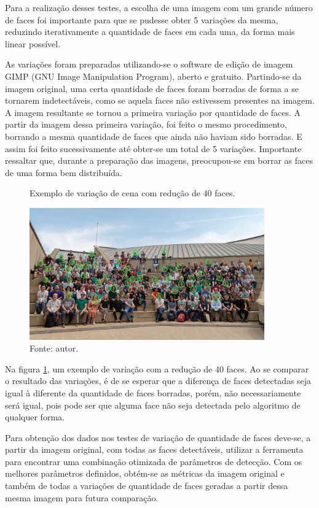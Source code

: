 Para a realização desses testes, a escolha de uma imagem com um grande número de faces foi importante para que se pudesse obter 5 variações da mesma, reduzindo iterativamente a quantidade de faces em cada uma, da forma mais linear possível.

As variações foram preparadas utilizando-se o software de edição de imagem GIMP (GNU Image Manipulation Program), aberto e gratuito. Partindo-se da imagem original, uma certa quantidade de faces foram borradas de forma a se tornarem indetectáveis, como se aquela faces não estivessem presentes na imagem. A imagem resultante se tornou a primeira variação por quantidade de faces. A partir da imagem dessa primeira variação, foi feito o mesmo procedimento, borrando a mesma quantidade de faces que ainda não haviam sido borradas. E assim foi feito sucessivamente até obter-se um total de 5 variações. Importante ressaltar que, durante a preparação das imagens, preocupou-se em borrar as faces de uma forma bem distribuída.

\begin{figure}[h]
    \centering
    \caption[Exemplo de variação de cena com redução de 40 faces.]{Exemplo de variação de cena com redução de 40 faces.}
    \includegraphics[width=0.9\textwidth]{Cap3_Desenvolvimento/Figures/exemplo_variacao_faces.jpg}
    \caption*{Fonte: autor.}
    \label{fig:exemploVariacaoFaces}
\end{figure}

Na figura \ref{fig:exemploVariacaoFaces}, um exemplo de variação com a redução de 40 faces. Ao se comparar o resultado das variações, é de se esperar que a diferença de faces detectadas seja igual à diferente da quantidade de faces borradas, porém, não necessariamente será igual, pois pode ser que alguma face não seja detectada pelo algoritmo de qualquer forma.

Para obtenção dos dados nos testes de variação de quantidade de faces deve-se, a partir da imagem original, com todas as faces detectáveis, utilizar a ferramenta para encontrar uma combinação otimizada de parâmetros de detecção. Com os melhores parâmetros definidos, obtém-se as métricas da imagem original e também de todas a variações de quantidade de faces geradas a partir dessa mesma imagem para futura comparação.

